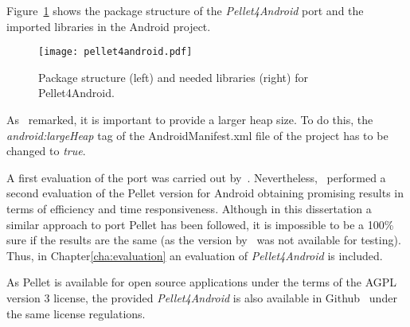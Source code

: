 Figure~\ref{fig:pellet4android} shows the package structure of the
\textit{Pellet4Android} port and the imported libraries in the Android project.
% 

\begin{figure}[H]
\centering
\texttt{[image: pellet4android.pdf]}
\caption{Package structure (left) and needed libraries (right) for Pellet4Android.}
\label{fig:pellet4android}
\end{figure}


As~\citet{yus_android_2013} remarked, it is important to provide a larger heap
size. To do this, the \textit{android:largeHeap} tag of the AndroidManifest.xml 
file of the project has to be changed to \textit{true}.

A first evaluation of the port was carried out by~\citet{yus_android_2013}.
Nevertheless,~\citet{bobed_android_2014} performed a second evaluation of the
Pellet version for Android obtaining promising results in terms of efficiency
and time responsiveness. Although in this dissertation a similar approach to port 
Pellet has been followed, it is impossible to be a 100\% sure if the results are 
the same (as the version by~\citet{yus_android_2013} was not available for testing). 
Thus, in Chapter\ref{cha:evaluation} an evaluation of \textit{Pellet4Android} is 
included.

As Pellet is available for open source applications under the terms of the AGPL
version 3 license, the provided \textit{Pellet4Android} is also available in
Github~\citep{pellet4android} under the same license regulations.